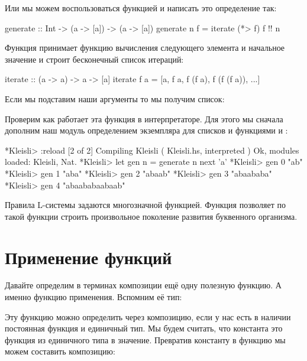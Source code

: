 Или мы можем воспользоваться функцией  и написать
это определение так:

\begin{code}
generate :: Int -> (a -> [a]) -> (a -> [a])
generate n f = iterate (*> f) f !! n
\end{code}

Функция  принимает функцию вычисления следующего
элемента и начальное значение и строит бесконечный список 
итераций:

\begin{code}
iterate :: (a -> a) -> a -> [a]
iterate f a = [a, f a, f (f a), f (f (f a)), ...]
\end{code}

Если мы подставим наши аргументы то мы получим список:

\begin{code}
[f, f*>f, f*>f*>f, f*>f*>f*>f, ...]
\end{code}

Проверим как работает эта функция в интерпретаторе. Для этого
мы сначала дополним наш модуль  определением экземпляра
для списков и функциями  и :

\begin{code}
*Kleisli> :reload
[2 of 2] Compiling Kleisli          ( Kleisli.hs, interpreted )
Ok, modules loaded: Kleisli, Nat.
*Kleisli> let gen n = generate n next 'a'
*Kleisli> gen 0
"ab"
*Kleisli> gen 1
"aba"
*Kleisli> gen 2
"abaab"
*Kleisli> gen 3
"abaababa"
*Kleisli> gen 4
"abaababaabaab"
\end{code}

Правила L-системы задаются многозначной функцией. Функция
 позволяет по такой функции строить произвольное
поколение развития буквенного организма.



\section{Применение функций}

Давайте определим в терминах композиции ещё одну полезную
функцию. А именно функцию применения. Вспомним её тип:


Эту функцию можно определить через композицию, если
у нас есть в наличии постоянная функция и единичный тип.
Мы будем считать, что константа это функция из единичного
типа в значение. Превратив константу в функцию мы можем 
составить композицию:

